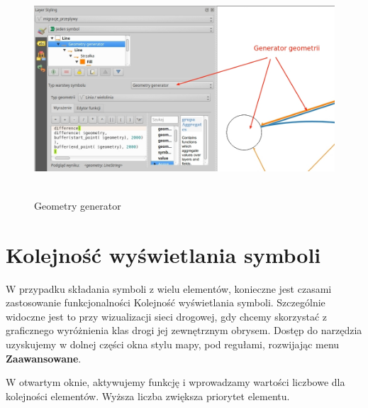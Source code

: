 \documentclass[12pt,a4paper]{book}
\begin{document}
\begin{figure}[!ht]
	\centering
	\includegraphics[height=8cm]{007-generator.jpg}
	\caption{Geometry generator}
\end{figure}

\section{Kolejność wyświetlania symboli}
W przypadku składania symboli z wielu elementów, konieczne jest czasami zastosowanie funkcjonalności  Kolejność wyświetlania symboli. Szczególnie widoczne jest to przy wizualizacji sieci drogowej, gdy chcemy skorzystać z graficznego wyróżnienia klas drogi jej zewnętrznym obrysem. Dostęp do narzędzia uzyskujemy w dolnej części okna stylu mapy, pod regułami, rozwijając menu \textbf{Zaawansowane}.

W otwartym oknie, aktywujemy funkcję i wprowadzamy wartości liczbowe dla kolejności elementów. Wyższa liczba zwiększa priorytet elementu.
\end{document}
